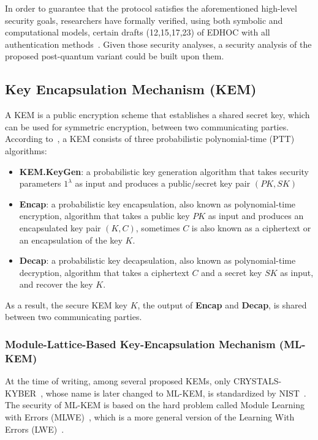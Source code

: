 In order to guarantee that the protocol satisfies the aforementioned high-level security goals,
researchers have formally verified, using
both symbolic and computational models, certain drafts (12,15,17,23) of EDHOC with all authentication
methods~\cite{edhoc-sec-analysis-draft-12,edhoc-sec-analysis-draft-15,edhoc-sec-analysis-draft-17,edhoc-sec-analysis-draft-23}.
Given those security analyses, a security analysis of the proposed post-quantum variant could
be built upon them.

\subsection{Key Encapsulation Mechanism (KEM)}
A KEM is a public encryption scheme that establishes a shared secret key, which can be used
for symmetric encryption, between two communicating parties. According to~\cite{kem-definition,kem-design},
a KEM consists of three probabilistic polynomial-time (PTT) algorithms:
\begin{itemize}
    \item \textbf{KEM.KeyGen}: a probabilistic key generation algorithm that takes security parameters
    $1^\lambda$ as input and produces a public/secret key pair $(PK,SK)$
    \item \textbf{Encap}: a probabilistic key encapsulation, also known as polynomial-time
    encryption, algorithm that takes a public key $PK$ as input and produces an encapsulated
    key pair $(K,C)$, sometimes $C$ is also known as a ciphertext or an encapsulation of the
    key $K$.
    \item \textbf{Decap}: a probabilistic key decapsulation, also known as polynomial-time
    decryption, algorithm that takes a ciphertext $C$ and a secret key $SK$ as input, and
    recover the key $K$.
\end{itemize}

As a result, the secure KEM key $K$, the output of \textbf{Encap} and \textbf{Decap}, is shared
between two communicating parties.

\subsubsection{Module-Lattice-Based Key-Encapsulation Mechanism (ML-KEM)}
At the time of writing, among several proposed KEMs, only CRYSTALS-KYBER~\cite{crystal-kyber},
whose name is later changed to ML-KEM, is standardized by NIST~\cite{FIPS203}. The security
of ML-KEM is based on the hard problem called Module Learning with Errors (MLWE)~\cite{mlwe}, which
is a more general version of the Learning With Errors (LWE)~\cite{lwe}.

